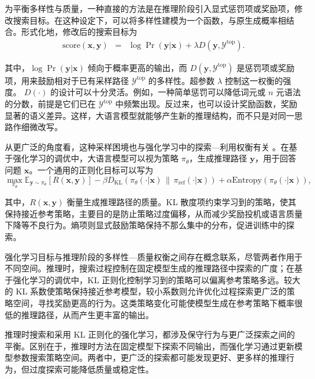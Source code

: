 为平衡多样性与质量，一种直接的方法是在推理阶段引入显式惩罚项或奖励项，修改搜索目标。在这种设定下，可以将多样性建模为一个函数，与原生成概率相结合。形式化地，修改后的搜索目标为
\begin{eqnarray}
\mathrm{score}(\mathbf{x},\mathbf{y}) & = & \log \Pr(\mathbf{y}|\mathbf{x}) + \lambda D(\mathbf{y},\mathcal{Y}^{\mathrm{top}}). \label{diversity-quality-inference}
\end{eqnarray}

\noindent 其中，$\log \Pr(\mathbf{y} | \mathbf{x})$ 倾向于概率更高的输出，而 $D(\mathbf{y},\mathcal{Y}^{\mathrm{top}})$ 是惩罚项或奖励项，用来鼓励相对于已有采样路径 $\mathcal{Y}^{\mathrm{top}}$ 的多样性。超参数 $\lambda$ 控制这一权衡的强度。
$D(\cdot)$ 的设计可以十分灵活。例如，一种简单惩罚可以降低词元或 $n$ 元语法的分数，前提是它们已在 $\mathcal{Y}^{\mathrm{top}}$ 中频繁出现。反过来，也可以设计奖励函数，奖励显著的语义差异。这样，大语言模型就能够产生新的推理结构，而不只是对同一思路作细微改写。

从更广泛的角度看，这种采样困境也与强化学习中的探索—利用权衡有关 \cite{Sutton-and-Barto:2018RL}。在基于强化学习的调优中，大语言模型可以视为策略 $\pi_\theta$，生成推理路径 $\mathbf{y}$，用于回答问题 $\mathbf{x}$。一个通用的正则化目标可以写为
\begin{equation}
\max_{\pi_\theta} \mathbb{E}_{\mathbf{y}\sim\pi_\theta} \left[R(\mathbf{x},\mathbf{y})\right] - \beta D_{\mathrm{KL}} \left( \pi_\theta(\cdot|\mathbf{x}) \,\|\,  \pi_{\mathrm{ref}}(\cdot|\mathbf{x}) \right) + \alpha \mathrm{Entropy} \left( \pi_\theta(\cdot|\mathbf{x}) \right),
\label{diversity-quality-rl}
\end{equation}

\noindent 其中，$R(\mathbf{x},\mathbf{y})$ 衡量生成推理路径的质量。KL 散度项约束学习到的策略，使其保持接近参考策略，主要目的是防止策略过度偏移，从而减少奖励投机或语言质量下降等不良行为。熵项则显式鼓励策略保持不那么集中的分布，促进训练中的探索。

强化学习目标与推理阶段的多样性—质量权衡之间存在概念联系，尽管两者作用于不同空间。推理时，搜索过程控制在固定模型生成的推理路径中探索的广度；在基于强化学习的调优中，KL 正则化控制学习到的策略可以偏离参考策略多远。较大的 KL 系数使策略保持接近参考模型，较小系数则允许优化过程探索更广泛的策略空间，寻找奖励更高的行为。这类策略变化可能使模型生成在参考策略下概率很低的推理路径，从而产生更丰富的输出。

推理时搜索和采用 KL 正则化的强化学习，都涉及保守行为与更广泛探索之间的平衡。区别在于，推理时方法在固定模型下探索不同输出，而强化学习通过更新模型参数搜索策略空间。两者中，更广泛的探索都可能发现更好、更多样的推理行为，但过度探索可能降低质量或稳定性。

